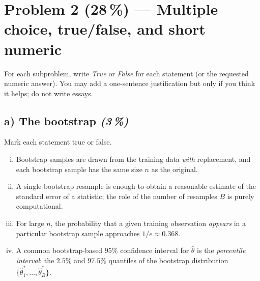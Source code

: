\documentclass[11pt,a4paper]{article}
\newcommand{\points}[1]{\textbf{(#1\,\%)}}
\newcommand{\subpoints}[1]{\textit{(#1\,\%)}}
\begin{document}
\vfill\eject

\section*{Problem 2 \points{28} --- Multiple choice, true/false, and short numeric}

For each subproblem, write \emph{True} or \emph{False} for each statement (or the requested numeric answer). You may add a one-sentence justification but only if you think it helps; do not write essays.

\subsection*{a) The bootstrap \subpoints{3}}
Mark each statement true or false.
\begin{enumerate}[(i)]
  \item Bootstrap samples are drawn from the training data \emph{with} replacement, and each bootstrap sample has the same size $n$ as the original.
  \item A single bootstrap resample is enough to obtain a reasonable estimate of the standard error of a statistic; the role of the number of resamples $B$ is purely computational.
  \item For large $n$, the probability that a given training observation \emph{appears} in a particular bootstrap sample approaches $1/e \approx 0.368$.
  \item A common bootstrap-based $95\%$ confidence interval for $\hat\theta$ is the \emph{percentile interval}: the $2.5\%$ and $97.5\%$ quantiles of the bootstrap distribution $\{\hat\theta^*_1, \dots, \hat\theta^*_B\}$.
\end{enumerate}
\end{document}

